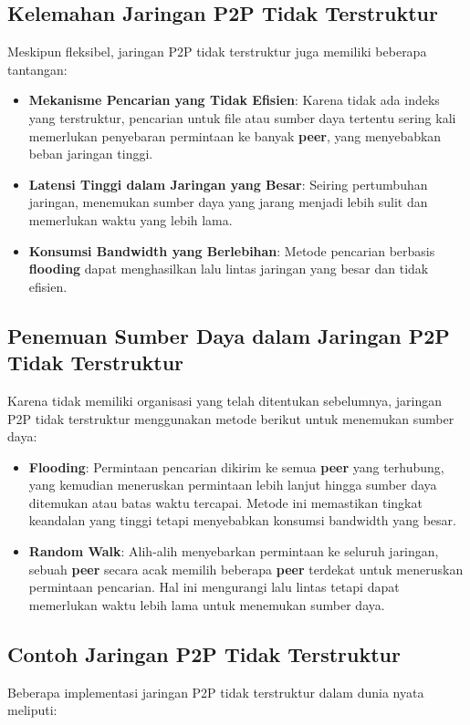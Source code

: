 \subsection{Kelemahan Jaringan P2P Tidak Terstruktur}
Meskipun fleksibel, jaringan P2P tidak terstruktur juga memiliki beberapa tantangan:
\begin{itemize}
	\item \textbf{Mekanisme Pencarian yang Tidak Efisien}: Karena tidak ada indeks yang terstruktur, pencarian untuk file atau sumber daya tertentu sering kali memerlukan penyebaran permintaan ke banyak \textbf{peer}, yang menyebabkan beban jaringan tinggi.
	\item \textbf{Latensi Tinggi dalam Jaringan yang Besar}: Seiring pertumbuhan jaringan, menemukan sumber daya yang jarang menjadi lebih sulit dan memerlukan waktu yang lebih lama.
	\item \textbf{Konsumsi Bandwidth yang Berlebihan}: Metode pencarian berbasis \textbf{flooding} dapat menghasilkan lalu lintas jaringan yang besar dan tidak efisien.
\end{itemize}

\subsection{Penemuan Sumber Daya dalam Jaringan P2P Tidak Terstruktur}
Karena tidak memiliki organisasi yang telah ditentukan sebelumnya, jaringan P2P tidak terstruktur menggunakan metode berikut untuk menemukan sumber daya:
\begin{itemize}
	\item \textbf{Flooding}: Permintaan pencarian dikirim ke semua \textbf{peer} yang terhubung, yang kemudian meneruskan permintaan lebih lanjut hingga sumber daya ditemukan atau batas waktu tercapai. Metode ini memastikan tingkat keandalan yang tinggi tetapi menyebabkan konsumsi bandwidth yang besar.
	\item \textbf{Random Walk}: Alih-alih menyebarkan permintaan ke seluruh jaringan, sebuah \textbf{peer} secara acak memilih beberapa \textbf{peer} terdekat untuk meneruskan permintaan pencarian. Hal ini mengurangi lalu lintas tetapi dapat memerlukan waktu lebih lama untuk menemukan sumber daya.
\end{itemize}

\subsection{Contoh Jaringan P2P Tidak Terstruktur}
Beberapa implementasi jaringan P2P tidak terstruktur dalam dunia nyata meliputi:

